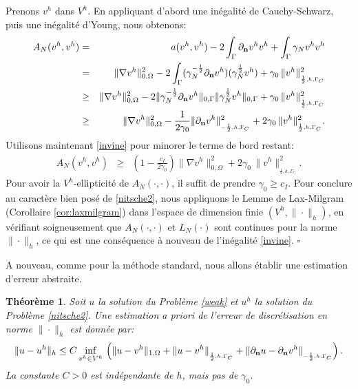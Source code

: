 \documentclass[11pt]{book}
\newtheorem{theorem}{Théorème}[section]
\newcommand{\be}{\begin{equation}}
\newcommand{\ee}{\end{equation}}
\newcommand{\beqs}{\begin{eqnarray*}}
\newcommand{\eeqs}{\end{eqnarray*}}
\newcommand{\bt}{\begin{theorem}}
\newcommand{\et}{\end{theorem}}
\newcommand{\cqfd}{{$\mbox{}$\hfill$\square$}}
\def\n{{\bf n}}
\def\G{{\Gamma}}
\newcommand{\Gc}{\Gamma_{C}}
\newcommand{\dnu}{\partial_{\n} u}
\newcommand{\dnv}{\partial_{\n} v}
\newcommand{\nngc}[1]{\|{#1}\|_{_{-\frac12,h,\Gc}}}
\newcommand{\npgc}[1]{\|{#1}\|_{_{\frac12,h,\Gc}}}
\begin{document}
\proof Prenons $v^h$ dans $V^h$. En appliquant d'abord une inégalité de Cauchy\--Schwarz, puis une inégalité d'Young, nous obtenons:
\beqs
A_N ( v^h , v^h ) %
& = & a ( v^h , v^h ) - 2 \int_\Gamma \dnv^h v^h + \int_\Gamma \gamma_N v^h v^h\\
& = & \| \nabla v^h \|^2_{0,\Omega} - 2 \int_\Gamma ({\gamma_N^{-\frac12}} \dnv^h) (\gamma_N^{\frac12} v^h) + \gamma_0 \, \npgc{v^h}^2\\
& \geq & \| \nabla v^h \|^2_{0,\Omega} - 2 \| {\gamma_N^{-\frac12}} \dnv^h \|_{0,\G} \| \gamma_N^{\frac12} v^h \|_{0,\G} + \gamma_0 \, \npgc{v^h}^2\\
& \geq & \| \nabla v^h \|^2_{0,\Omega} - \frac1{2\gamma_0} \nngc{\dnv^h}^2 + %
{2 \gamma_0}\, \npgc{v^h}^2.
\eeqs
Utilisons maintenant \eqref{invine} pour minorer le terme de bord restant:
\beqs
 A_N ( v^h , v^h ) %
& \geq & \left (1 - \frac{c_I}{2 \gamma_0} \right ) \| \nabla v^h \|^2_{0,\Omega} + %
{2 \gamma_0}\, \npgc{v^h}^2.
\eeqs
Pour avoir la $V^h$-ellipticité de $A_N(\cdot,\cdot)$, il suffit de prendre %
$\gamma_0 \geq c_I$. Pour conclure au caractère bien posé de \eqref{nitsche2}, nous appliquons le Lemme de Lax-Milgram (Corollaire \ref{cor:laxmilgram}) dans l'espace de dimension finie $(V^h,\|\cdot\|_h)$, en vérifiant soigneusement que $A_N(\cdot,\cdot)$ et $L_N (\cdot)$ sont continues pour la norme $\| \cdot \|_h$, ce qui est une conséquence à nouveau de l'inégalité \eqref{invine}.
\cqfd

\medskip

A nouveau, comme pour la méthode standard, nous allons établir une estimation d'erreur abstraite.

\bt \label{thm:estimH1nitsche} Soit $u$ la solution du Problème \eqref{weak} et $u^h$ la solution du Problème \eqref{nitsche2}. Une estimation \emph{a priori} de l'erreur de discrétisation en norme $\| \cdot \|_h$ est donnée par:
\be \label{erreurH1nitsche}
 \| u - u^h \|_h \leq C \inf_{v^h \in V^h} \, %
 \left (
  \| u - v^h\|_{1,\Omega} + \npgc{ u- v^h } + \nngc{ \dnu - \dnv^h }
 \right ).
\ee
La constante $C>0$ est indépendante de $h$, mais pas de $\gamma_0$. %
\et
\end{document}
